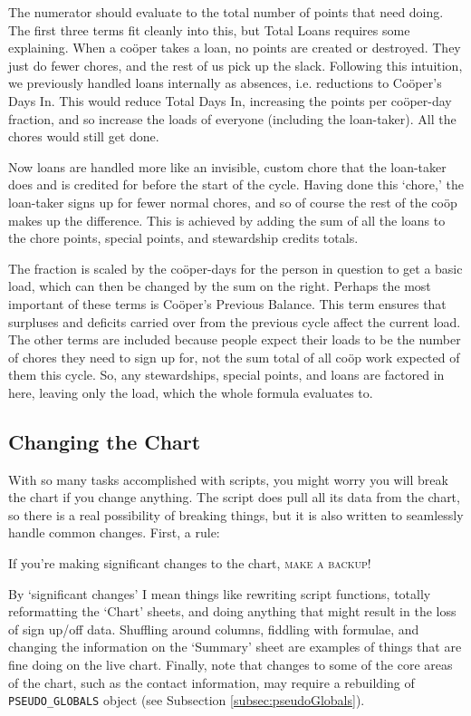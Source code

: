 \documentclass{article}
\begin{document}
The numerator should evaluate to the total number of points that need doing.
The first three terms fit cleanly into this, but Total Loans requires some explaining.
When a co\"{o}per takes a loan, no points are created or destroyed.
They just do fewer chores, and the rest of us pick up the slack.
Following this intuition, we previously handled loans internally as absences, i.e. reductions to Co\"{o}per's Days In.
This would reduce Total Days In, increasing the points per co\"{o}per-day fraction, and so increase the loads of everyone (including the loan-taker).
All the chores would still get done.

Now loans are handled more like an invisible, custom chore that the loan-taker does and is credited for before the start of the cycle. 
Having done this `chore,' the loan-taker signs up for fewer normal chores, and so of course the rest of the co\"{o}p makes up the difference. 
This is achieved by adding the sum of all the loans to the chore points, special points, and stewardship credits totals.

The fraction is scaled by the co\"{o}per-days for the person in question to get a basic load, which can then be changed by the sum on the right.
Perhaps the most important of these terms is Co\"{o}per's Previous Balance.
This term ensures that surpluses and deficits carried over from the previous cycle affect the current load.
The other terms are included because people expect their loads to be the number of chores they need to sign up for, not the sum total of all co\"{o}p work expected of them this cycle.
So, any stewardships, special points, and loans are factored in here, leaving only the load, which the whole formula evaluates to.

\subsection{Changing the Chart}
With so many tasks accomplished with scripts, you might worry you will break the chart if you change anything.
The script does pull all its data from the chart, so there is a real possibility of breaking things, but it is also written to seamlessly handle common changes.
First, a rule:
\begin{center}
If you're making significant changes to the chart, {\scshape make a backup!}
\end{center}
By `significant changes' I mean things like rewriting script functions, totally reformatting the `Chart' sheets, and doing anything that might result in the loss of sign up/off data.
Shuffling around columns, fiddling with formulae, and changing the information on the `Summary' sheet are examples of things that are fine doing on the live chart.
Finally, note that changes to some of the core areas of the chart, such as the contact information, may require a rebuilding of \texttt{PSEUDO\_GLOBALS} object (see Subsection \ref{subsec:pseudoGlobals}).
\end{document}
